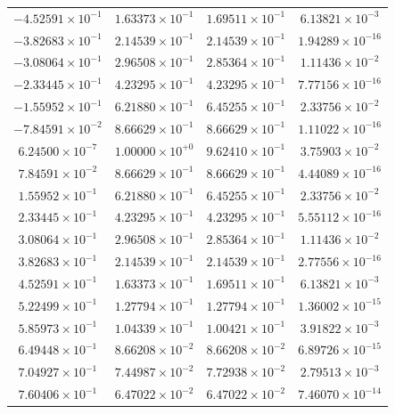 \documentclass[a4paper]{book}
\begin{document}
\begin{enumerate}
\begin{center}
\begin{supertabular}{|cccc|}
        $-4.52591\times10^{-1}$ & $1.63373\times10^{-1}$ & $1.69511\times10^{-1}$ & $6.13821\times10^{-3}$  \\
        $-3.82683\times10^{-1}$ & $2.14539\times10^{-1}$ & $2.14539\times10^{-1}$ & $1.94289\times10^{-16}$ \\
        $-3.08064\times10^{-1}$ & $2.96508\times10^{-1}$ & $2.85364\times10^{-1}$ & $1.11436\times10^{-2}$  \\
        $-2.33445\times10^{-1}$ & $4.23295\times10^{-1}$ & $4.23295\times10^{-1}$ & $7.77156\times10^{-16}$ \\
        $-1.55952\times10^{-1}$ & $6.21880\times10^{-1}$ & $6.45255\times10^{-1}$ & $2.33756\times10^{-2}$  \\
        $-7.84591\times10^{-2}$ & $8.66629\times10^{-1}$ & $8.66629\times10^{-1}$ & $1.11022\times10^{-16}$ \\
        $6.24500\times10^{-7}$  & $1.00000\times10^{+0}$ & $9.62410\times10^{-1}$ & $3.75903\times10^{-2}$  \\
        $7.84591\times10^{-2}$  & $8.66629\times10^{-1}$ & $8.66629\times10^{-1}$ & $4.44089\times10^{-16}$ \\
        $1.55952\times10^{-1}$  & $6.21880\times10^{-1}$ & $6.45255\times10^{-1}$ & $2.33756\times10^{-2}$  \\
        $2.33445\times10^{-1}$  & $4.23295\times10^{-1}$ & $4.23295\times10^{-1}$ & $5.55112\times10^{-16}$ \\
        $3.08064\times10^{-1}$  & $2.96508\times10^{-1}$ & $2.85364\times10^{-1}$ & $1.11436\times10^{-2}$  \\
        $3.82683\times10^{-1}$  & $2.14539\times10^{-1}$ & $2.14539\times10^{-1}$ & $2.77556\times10^{-16}$ \\
        $4.52591\times10^{-1}$  & $1.63373\times10^{-1}$ & $1.69511\times10^{-1}$ & $6.13821\times10^{-3}$  \\
        $5.22499\times10^{-1}$  & $1.27794\times10^{-1}$ & $1.27794\times10^{-1}$ & $1.36002\times10^{-15}$ \\
        $5.85973\times10^{-1}$  & $1.04339\times10^{-1}$ & $1.00421\times10^{-1}$ & $3.91822\times10^{-3}$  \\
        $6.49448\times10^{-1}$  & $8.66208\times10^{-2}$ & $8.66208\times10^{-2}$ & $6.89726\times10^{-15}$ \\
        $7.04927\times10^{-1}$  & $7.44987\times10^{-2}$ & $7.72938\times10^{-2}$ & $2.79513\times10^{-3}$  \\
        $7.60406\times10^{-1}$  & $6.47022\times10^{-2}$ & $6.47022\times10^{-2}$ & $7.46070\times10^{-14}$ \\

\end{supertabular}
\end{center}
\end{enumerate}
\end{document}
